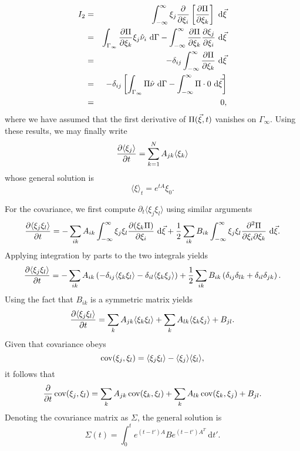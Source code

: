 \documentclass[10pt,letterpaper]{article}
\begin{document}
\begin{eqnarray}
I_2 &=& \intxi{\xi_j \pderiv{}{\xi_i}\left[\pderiv{\Pi}{\xi_k}\right]}\nonumber\\
&=& \int_{\Gamma_\infty} \pderiv{\Pi}{\xi_k} \xi_j \hat{\nu}_i\ \text{d}\Gamma - \intxi{\pderiv{\Pi}{\xi_k}\pderiv{\xi_j}{\xi_i}} \nonumber \\
&=& - \delta_{ij} \intxi{ \pderiv{\Pi}{\xi_k}} \nonumber \\
&=& -\delta_{ij} \left[\int_{\Gamma_\infty} \Pi \hat{\nu}\ \text{d}\Gamma - \intxi{\Pi \cdot 0}\right] \nonumber \\
&=& 0,
\end{eqnarray}
where we have assumed that the first derivative of $\Pi(\vec{\xi},t)$ vanishes on $\Gamma_\infty$. Using these results, we may finally write\cite{Van92}
\begin{equation}
\frac{\partial\langle \xi_j \rangle}{\partial t} = \sum_{k=1}^N A_{jk} \langle\xi_k \rangle
\end{equation}
whose general solution is\cite{Van92}
\begin{equation}
\langle \xi \rangle_t = e^{tA}\xi_0.
\end{equation}

For the covariance, we first compute $\partial_t\langle\xi_j \xi_l \rangle$ using similar arguments
\begin{equation}
\frac{\partial\langle\xi_j \xi_l \rangle}{\partial t} = - \sum_{ik}A_{ik}\int_{-\infty}^{\infty} \xi_j \xi_l \frac{\partial(\xi_k \Pi)}{\partial\xi_i}\ \text{d}\vec{\xi} + \frac{1}{2}\sum_{ik}B_{ik} \int_{-\infty}^{\infty} \xi_j \xi_l \frac{\partial^2\Pi}{\partial\xi_i\partial\xi_k}\ \text{d}\vec{\xi}.
\end{equation}
Applying integration by parts to the two integrals yields
\begin{equation}
\frac{\partial\langle\xi_j \xi_l \rangle}{\partial t} = - \sum_{ik} A_{ik}\left(-\delta_{ij}\langle \xi_k \xi_l \rangle - \delta_{il} \langle \xi_k \xi_j \rangle \right) + \frac{1}{2}\sum_{ik} B_{ik} \left(\delta_{ij}\delta_{lk} + \delta_{il}\delta_{jk}\right).
\end{equation}
Using the fact that $B_{ik}$ is a symmetric matrix yields
\begin{equation}
\frac{\partial\langle\xi_j \xi_l \rangle}{\partial t} = \sum_k A_{jk}\langle \xi_k \xi_l\rangle + \sum_k A_{lk}\langle \xi_k \xi_j \rangle + B_{jl}.
\end{equation}
Given that covariance obeys
\begin{equation}
\operatorname{cov}(\xi_j, \xi_l) = \langle \xi_j \xi_l \rangle - \langle\xi_j\rangle\langle\xi_l\rangle,
\end{equation}
it follows that
\begin{equation}
\frac{\partial}{\partial t}\operatorname{cov}(\xi_j, \xi_l) =  \sum_k A_{jk}\operatorname{cov}(\xi_k, \xi_l) + \sum_k A_{lk}\operatorname{cov}(\xi_k, \xi_j) + B_{jl}.
\end{equation}
Denoting the covariance matrix as $\Sigma$, the general solution is \cite{Van92}
\begin{equation}
\Sigma(t) = \int_0^t e^{(t-t')A} B e^{(t-t')A^T}\ \text{d}t'.
\end{equation}
\end{document}
